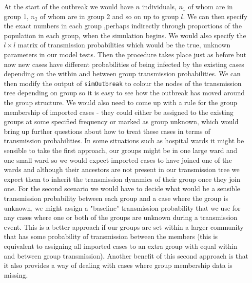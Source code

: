 \documentclass[11pt,a4paper]{report}
\begin{document}
At the start of the outbreak we would have $n$ individuals, $n_1$ of whom are in group 1, $n_2$ of whom are in group 2 and so on up to group $l$. We can then specify the exact numbers in each group ,perhaps indirectly through proportions of the population in each group, when the simulation begins. We would also specify the $l \times l$ matrix of transmission probabilities which would be the true, unknown parameters in our model tests. Then the procedure takes place just as before but now new cases have different probabilities of being infected by the existing cases depending on the within and between group transmission probabilities. We can then modify the output of {\tt simOutbreak} to colour the nodes of the transmission tree depending on group so it is easy to see how the outbreak has moved around the group structure. We would also need to come up with a rule for the group membership of imported cases - they could either be assigned to the existing groups at some specified frequency or marked as group unknown, which would bring up further questions about how to treat these cases in terms of transmission probabilities. In some situations such as hospital wards it might be sensible to take the first approach, our groups might be in one large ward and one small ward so we would expect imported cases to have joined one of the wards and although their ancestors are not present in our transmission tree we expect them to inherit the transmission dynamics of their group once they join one. For the second scenario we would have to decide what would be a sensible transmission probability between each group and a case where the group is unknown, we might assign a "baseline" transmission probability that we use for any cases where one or both of the groups are unknown during a transmission event. This is a better approach if our groups are set within a larger community that has some probability of transmission between the members (this is equivalent to assigning all imported cases to an extra group with equal within and between group transmission). Another benefit of this second approach is that it also provides a way of dealing with cases where group membership data is missing.
\end{document}
